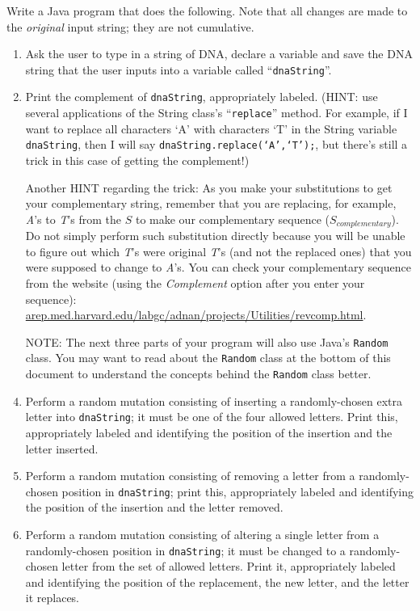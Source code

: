 Write a Java program that does the following.
Note that all changes are made to the {\em original} input string; they
are not cumulative.
\begin{enumerate}
\item
Ask the user to type in a string of DNA, declare a variable and save the DNA string that the user inputs into a variable called ``{\tt dnaString}''.
\item
Print the complement of {\tt dnaString}, appropriately labeled. 
(HINT: use several applications of the String class's ``{\tt replace}'' method. For example, if I want to replace all characters `A' with characters `T' in the String variable {\tt dnaString}, then I will say {\tt dnaString.replace(`A',`T');}, but there's still a trick in this case of getting the complement!)

Another HINT regarding the trick: As you make your substitutions to get your complementary string, remember that you are replacing, for example, \emph{A}'s to \emph{T}'s from the $S$ to make our complementary sequence ($S_{complementary}$). Do not simply perform such substitution directly because you will be unable to figure out which \emph{T}'s were original \emph{T}'s (and not the replaced ones) that you were supposed to change to \emph{A}'s. You can check your complementary sequence from the website  (using the \emph{Complement} option after you enter your sequence): \url{arep.med.harvard.edu/labgc/adnan/projects/Utilities/revcomp.html}.

\item[NOTE:]
The next three parts of your program will also use Java's {\tt Random} class. You may want to read about the {\tt Random} class at the bottom of this document to understand the concepts behind the {\tt Random} class better.
\item
Perform a random mutation consisting of inserting a randomly-chosen
extra letter into {\tt dnaString}; it
must be one of the four allowed letters. Print this, appropriately labeled
and identifying the position of the insertion and the letter inserted.
\item
Perform a random mutation consisting of removing a letter from a 
randomly-chosen position in {\tt dnaString}; print this, appropriately labeled
and identifying the position of the insertion and the letter removed.
\item
Perform a random mutation consisting of altering a single letter from a
randomly-chosen position in {\tt dnaString}; it must be changed to a
randomly-chosen letter from the set of allowed letters. Print it, appropriately
labeled 
and identifying the position of the replacement, the new letter, and the
letter it replaces.
\end{enumerate}


